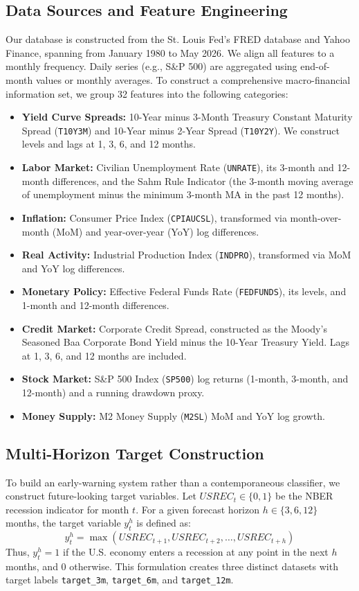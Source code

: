 \documentclass[11pt]{article}
\begin{document}
\subsection{Data Sources and Feature Engineering}
Our database is constructed from the St. Louis Fed's FRED database and Yahoo Finance, spanning from January 1980 to May 2026. We align all features to a monthly frequency. Daily series (e.g., S&P 500) are aggregated using end-of-month values or monthly averages. 
To construct a comprehensive macro-financial information set, we group 32 features into the following categories:
\begin{itemize}
    \item \textbf{Yield Curve Spreads:} 10-Year minus 3-Month Treasury Constant Maturity Spread (\texttt{T10Y3M}) and 10-Year minus 2-Year Spread (\texttt{T10Y2Y}). We construct levels and lags at 1, 3, 6, and 12 months.
    \item \textbf{Labor Market:} Civilian Unemployment Rate (\texttt{UNRATE}), its 3-month and 12-month differences, and the Sahm Rule Indicator (the 3-month moving average of unemployment minus the minimum 3-month MA in the past 12 months).
    \item \textbf{Inflation:} Consumer Price Index (\texttt{CPIAUCSL}), transformed via month-over-month (MoM) and year-over-year (YoY) log differences.
    \item \textbf{Real Activity:} Industrial Production Index (\texttt{INDPRO}), transformed via MoM and YoY log differences.
    \item \textbf{Monetary Policy:} Effective Federal Funds Rate (\texttt{FEDFUNDS}), its levels, and 1-month and 12-month differences.
    \item \textbf{Credit Market:} Corporate Credit Spread, constructed as the Moody's Seasoned Baa Corporate Bond Yield minus the 10-Year Treasury Yield. Lags at 1, 3, 6, and 12 months are included.
    \item \textbf{Stock Market:} S&P 500 Index (\texttt{SP500}) log returns (1-month, 3-month, and 12-month) and a running drawdown proxy.
    \item \textbf{Money Supply:} M2 Money Supply (\texttt{M2SL}) MoM and YoY log growth.
\end{itemize}

\subsection{Multi-Horizon Target Construction}
To build an early-warning system rather than a contemporaneous classifier, we construct future-looking target variables. Let $USREC_t \in \{0, 1\}$ be the NBER recession indicator for month $t$. For a given forecast horizon $h \in \{3, 6, 12\}$ months, the target variable $y_t^h$ is defined as:
\begin{equation}
y_t^h = \max(USREC_{t+1}, USREC_{t+2}, \dots, USREC_{t+h})
\end{equation}
Thus, $y_t^h = 1$ if the U.S. economy enters a recession at any point in the next $h$ months, and $0$ otherwise. This formulation creates three distinct datasets with target labels \texttt{target\_3m}, \texttt{target\_6m}, and \texttt{target\_12m}.
\end{document}
